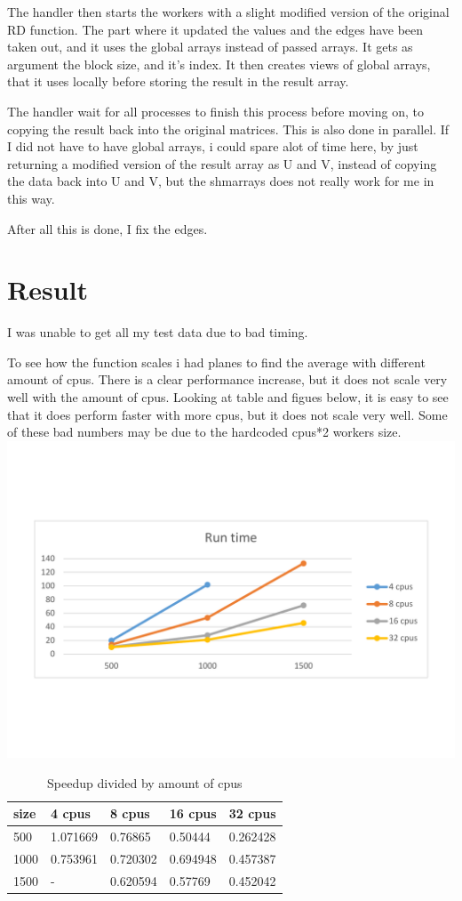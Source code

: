 \documentclass{Article}
\begin{document}
The handler then starts the workers with a slight modified version of the original RD function. The part where it updated the values and the edges have been taken out, and it uses the global arrays instead of passed arrays. It gets as argument the block size, and it's index. It then creates views of global arrays, that it uses locally before storing the result in the result array.

The handler wait for all processes to finish this process before moving on, to copying the result back into the original matrices. This is also done in parallel. If I did not have to have global arrays, i could spare alot of time here, by just returning a modified version of the result array as U and V, instead of copying the data back into U and V, but the shmarrays does not really work for me in this way.

After all this is done, I fix the edges.

\section{Result}
I was unable to get all my test data due to bad timing.

To see how the function scales i had planes to find the average with different amount of cpus. There is a clear performance increase, but it does not scale very well with the amount of cpus. Looking at table and figues below, it is easy to see that it does perform faster with more cpus, but it does not scale very well. Some of these bad numbers may be due to the hardcoded cpus*2 workers size.
\includegraphics[clip, trim=0 5cm 0 5cm, width=1\textwidth]{plots}\\
\begin{table}[h!]
\centering
\caption{Speedup divided by amount of cpus}
\label{my-label}
\begin{tabular}{|l|l|l|l|l|}
\hline
size & 4 cpus   & 8 cpus   & 16 cpus  & 32 cpus  \\ \hline
500  & 1.071669 & 0.76865  & 0.50444  & 0.262428 \\ \hline
1000 & 0.753961 & 0.720302 & 0.694948 & 0.457387 \\ \hline
1500 & -        & 0.620594 & 0.57769  & 0.452042 \\ \hline
\end{tabular}
\end{table}
\end{document}
